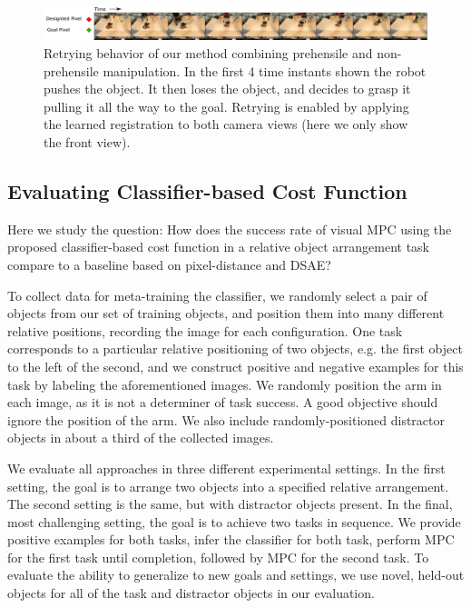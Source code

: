 \begin{figure}
	\centering
	\includegraphics[width=1.0\textwidth]{images_rfr/pick_place_plush.pdf}
	\caption{\small{Retrying behavior of our method combining prehensile and non-prehensile manipulation. In the first 4 time instants shown the robot pushes the object. It then loses the object, and decides to grasp it pulling it all the way to the goal. Retrying is enabled by applying the learned registration to both camera views (here we only show the front view).}}
	\label{fig:push_grasp}
	
\end{figure}

\subsection{Evaluating Classifier-based Cost Function}
\label{subsec:eval_classifier}

Here we study the question: How does the success rate of visual MPC using the proposed classifier-based cost function in a relative object arrangement task compare to a baseline based on pixel-distance and DSAE?


To collect data for meta-training the classifier, we randomly select a pair of objects from our set of training objects, and position them into many different relative positions, recording the image for each configuration. One task corresponds to a particular relative positioning of two objects, e.g. the first object to the left of the second, and we construct positive and negative examples for this task by labeling the aforementioned images. We randomly position the arm in each image, as it is not a determiner of task success. A good objective should ignore the position of the arm. We also include randomly-positioned distractor objects in about a third of the collected images.

We evaluate all approaches in three different experimental settings. In the first setting, the goal is to arrange two objects into a specified relative arrangement. The second setting is the same, but with distractor objects present. In the final, most challenging setting, the goal is to achieve two tasks in sequence. We provide positive examples for both tasks, infer the classifier for both task, perform MPC for the first task until completion, followed by MPC for the second task. To evaluate the ability to generalize to new goals and settings, we use novel, held-out objects for all of the task and distractor objects in our evaluation. 

